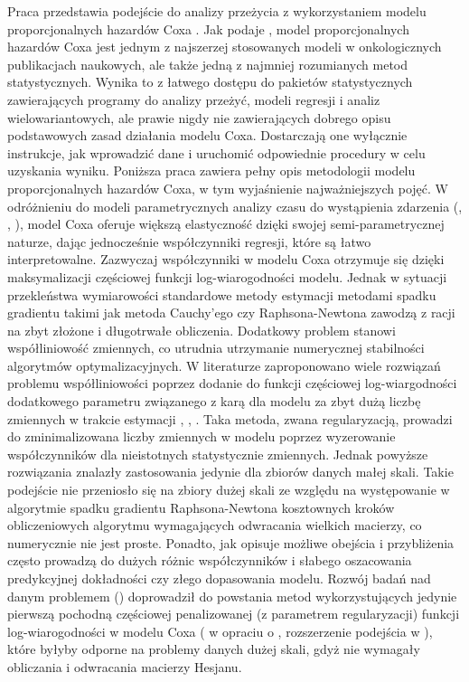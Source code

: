 Praca przedstawia podejście do analizy przeżycia z wykorzystaniem modelu proporcjonalnych hazardów Coxa \cite{cox}. Jak podaje \cite{assel}, model proporcjonalnych hazardów Coxa jest jednym z najszerzej stosowanych modeli w onkologicznych publikacjach naukowych, ale także jedną z najmniej rozumianych metod statystycznych. Wynika to z łatwego dostępu do pakietów statystycznych zawierających programy do analizy przeżyć, modeli regresji i analiz wielowariantowych, ale prawie nigdy nie zawierających dobrego opisu podstawowych zasad działania modelu Coxa. Dostarczają one wyłącznie instrukcje, jak wprowadzić dane i uruchomić odpowiednie procedury w celu uzyskania wyniku. Poniższa praca zawiera pełny opis metodologii modelu proporcjonalnych hazardów Coxa, w tym wyjaśnienie najważniejszych pojęć. W odróżnieniu do modeli parametrycznych analizy czasu do wystąpienia zdarzenia (\cite{klein}, \cite{collett}, \cite{hosmer}), model Coxa oferuje większą elastyczność dzięki swojej semi-parametrycznej naturze, dając jednocześnie  współczynniki regresji, które są łatwo interpretowalne. Zazwyczaj współczynniki w modelu Coxa otrzymuje się dzięki maksymalizacji częściowej funkcji log-wiarogodności modelu. Jednak w sytuacji przekleństwa wymiarowości standardowe metody estymacji metodami spadku gradientu takimi jak metoda Cauchy'ego czy Raphsona-Newtona zawodzą z racji na zbyt złożone i długotrwałe obliczenia. Dodatkowy problem stanowi współliniowość zmiennych, co utrudnia utrzymanie numerycznej stabilności algorytmów optymalizacyjnych. W literaturze zaproponowano wiele rozwiązań problemu współliniowości poprzez dodanie do funkcji częściowej log-wiargodności dodatkowego parametru związanego z karą dla modelu za zbyt dużą liczbę zmiennych w trakcie estymacji \cite{parkm}, \cite{sohn}, \cite{goemann}. Taka metoda, zwana regularyzacją, prowadzi do zminimalizowana liczby zmiennych w modelu poprzez wyzerowanie współczynników dla nieistotnych statystycznie zmiennych. Jednak powyższe rozwiązania znalazły zastosowania jedynie dla zbiorów danych małej skali. Takie podejście nie przeniosło się na zbiory dużej skali ze względu na występowanie w algorytmie spadku gradientu Raphsona-Newtona kosztownych kroków obliczeniowych algorytmu wymagających odwracania wielkich macierzy, co numerycznie nie jest proste. Ponadto, jak opisuje \cite{mital} możliwe obejścia i przybliżenia często prowadzą do dużych różnic współczynników i słabego oszacowania predykcyjnej dokładności czy złego dopasowania modelu. Rozwój badań nad danym problemem (\cite{KIMKIM}) doprowadził do powstania metod wykorzystujących jedynie pierwszą pochodną częściowej penalizowanej (z parametrem regularyzacji) funkcji log-wiarogodności w modelu Coxa (\cite{sohn} w opraciu o \cite{KIM}, rozszerzenie podejścia w \cite{mital}), które byłyby odporne na problemy danych dużej skali, gdyż nie wymagały obliczania i odwracania macierzy Hesjanu. 

